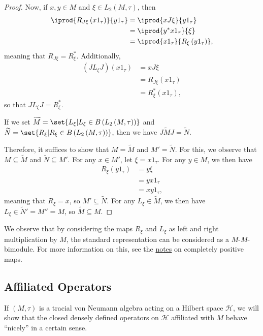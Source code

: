 \documentclass[10pt]{mypackage}
\begin{document}
\begin{proof}
  Now, if $x,y\in M$ and $\xi\in L_2\left( M,\tau \right)$, then
  \begin{align*}
    \iprod{R_{J\xi}\left( x1_{\tau} \right)}{y1_{\tau}} &= \iprod{xJ\xi}{y1_{\tau}}\\
                                                        &= \iprod{y^{\ast}x1_{\tau}}{\xi}\\
                                                        &= \iprod{x1_{\tau}}{R_{\xi}\left( y1_{\tau} \right)},
  \end{align*}
  meaning that $R_{J\xi} = R_{\xi}^{\ast}$. Additionally,
  \begin{align*}
    \left( JL_{\xi}J \right)\left( x1_{\tau} \right) &= xJ\xi\\
                                                     &= R_{J\xi} \left( x1_{\tau} \right)\\
                                                     &= R_{\xi}^{\ast}\left( x1_{\tau} \right),
  \end{align*}
  so that $JL_{\xi}J = R_{\xi}^{\ast}$.

  If we set $ \widetilde{M} = \set{L_{\xi} | L_{\xi}\in B\left( L_2\left( M,\tau \right) \right)} $ and $ \widetilde{N} = \set{R_{\xi} | R_{\xi}\in B\left( L_2\left( M,\tau \right) \right)} $, then we have $J \widetilde{M}J = \widetilde{N}$.

  Therefore, it suffices to show that $M = \widetilde{M}$ and $M' = \widetilde{N}$. For this, we observe that $M\subseteq \widetilde{M}$ and $ \widetilde{N}\subseteq M' $. For any $x\in M'$, let $\xi = x1_{\tau}$. For any $y\in M$, we then have
  \begin{align*}
    R_{\xi}\left( y1_{\tau} \right) &= y\xi\\
                                    &= yx1_{\tau}\\
                                    &= xy1_{\tau},
  \end{align*}
  meaning that $R_{\xi} = x$, so $M'\subseteq \widetilde{N}$. For any $L_{\xi}\in \widetilde{M}$, we then have $L_{\xi}\in \widetilde{N}' = M'' = M$, so $\widetilde{M}\subseteq M$.
\end{proof}
We observe that by considering the maps $R_{\xi}$ and $L_{\xi}$ as left and right multiplication by $M$, the standard representation can be considered as a $M$-$M$-bimodule. For more information on this, see the \href{https://ai-bearing.github.io/Classes_and_Homework/After\%20College/Other\%20Notes/completely_positive_maps.pdf}{notes} on completely positive maps.
\subsection{Affiliated Operators}%
If $\left( M,\tau \right)$ is a tracial von Neumann algebra acting on a Hilbert space $\mathcal{H}$, we will show that the closed densely defined operators on $\mathcal{H}$ affiliated with $M$ behave ``nicely'' in a certain sense.
\end{document}
